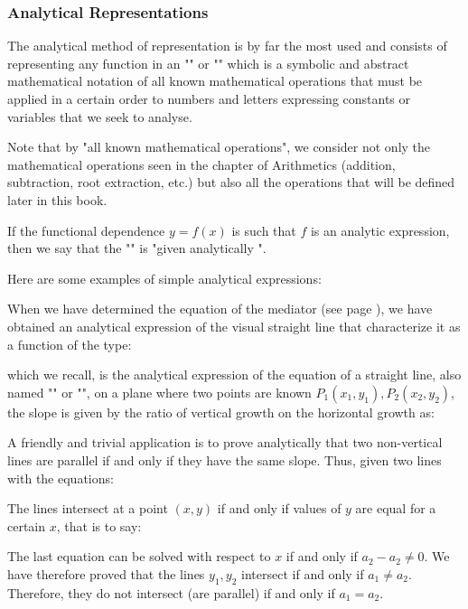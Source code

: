 	\subsubsection{Analytical Representations}
	The analytical method of representation is by far the most used and consists of representing any function in an "" or "" which is a symbolic and abstract mathematical notation of all known mathematical operations that must be applied in a certain order to numbers and letters expressing constants or variables that we seek to analyse.
	
	Note that by "all known mathematical operations", we consider not only the mathematical operations seen in the chapter of Arithmetics (addition, subtraction, root extraction, etc.) but also all the operations that will be defined later in this book.
	
	If the functional dependence $y=f(x)$ is such that $f$ is an analytic expression, then we say that the "" is "given analytically ". 

	Here are some examples of simple analytical expressions:
	
	When we have determined the equation of the mediator (see page \pageref{mediator analytic expression}), we have obtained an analytical expression of the visual straight line that characterize it as a function of the type:
	
	which we recall, is the analytical expression of the equation of a straight line, also named "" or "", on a plane where two points are known $P_1(x_1,y_1),P_2(x_2,y_2)$, the slope is given by the ratio of vertical growth on the horizontal growth as:
	
	A friendly and trivial application is to prove analytically that two non-vertical lines are parallel if and only if they have the same slope. Thus, given two lines with the equations:
	
	The lines intersect at a point $(x, y)$ if and only if values of $y$ are equal for a certain $x$, that is to say:
	
	The last equation can be solved with respect to $x$ if and only if $a_2-a_2\neq 0$. We have therefore proved that the lines $y_1,y_2$ intersect if and only if $a_1\neq a_2$. Therefore, they do not intersect (are parallel) if and only if $a_1=a_2$.
	
